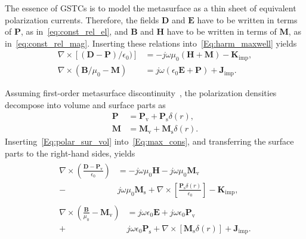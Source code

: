 \documentclass[journal,transaction]{IEEEtran}
\newcommand{\ve}[1]{\mathbf{#1}}
\begin{document}
The essence of GSTCs is to model the metasurface as a thin sheet of equivalent polarization currents. Therefore, the fields $\ve{D}$ and $\ve{E}$ have to be written in terms of $\ve{P}$, as in~\eqref{eq:const_rel_el}, and $\ve{B}$ and $\ve{H}$ have to be written in terms of $\ve{M}$, as in~\eqref{eq:const_rel_mag}. Inserting these relations into~\eqref{Eq:harm_maxwell} yields
%
\begin{subequations}\label{Eq:max_cons}
\begin{align}
\nabla\times[(\ve{D}-\ve{P})/\epsilon_0)]&=-j\omega\mu_0(\ve{H}+\ve{M})-\ve{K}_\text{imp},\\
\nabla\times(\ve{B}/\mu_0-\ve{M})&=j\omega(\epsilon_0\ve{E}+\ve{P})+\ve{J}_\text{imp}.
\end{align}
\end{subequations}

Assuming first-order metasurface discontinuity~\cite{synthesis_planar_KA2015}, the polarization densities decompose into volume and surface parts as
%
\begin{subequations}\label{Eq:polar_sur_vol}
\begin{align}
\ve{P}&=\ve{P}_\text{v}+\ve{P}_\text{s}\delta({r}),\\
\ve{M}&=\ve{M}_\text{v}+\ve{M}_\text{s}\delta({r}).
\end{align}
\end{subequations}
%
Inserting~\eqref{Eq:polar_sur_vol} into~\eqref{Eq:max_cons}, and transferring the surface parts to the right-hand sides, yields
%
\begin{subequations}\label{Eq:app_max_cons_EH}
\begin{align}
\begin{split}
\nabla\times\left(\frac{\ve{D}-\ve{P}_\text{v}}{\epsilon_0}\right)&=-j\omega\mu_0\ve{H}-j\omega\mu_0\ve{M}_\text{v}\\
-&j\omega\mu_0\ve{M}_\text{s}+\nabla\times\left[\frac{\ve{P}_\text{s}\delta(r)}{\epsilon_0}\right]-\ve{K}_\text{imp},
\end{split}\\
\begin{split}
\nabla\times\left(\frac{\ve{B}}{\mu_0}-\ve{M}_\text{v}\right)&=j\omega\epsilon_0\ve{E}+j\omega\epsilon_0\ve{P}_\text{v}\\
+&j\omega\epsilon_0\ve{P}_\text{s}+\nabla\times[\ve{M}_\text{s}\delta(r)]+\ve{J}_\text{imp}.
\end{split}
\end{align}
\end{subequations}
\end{document}

